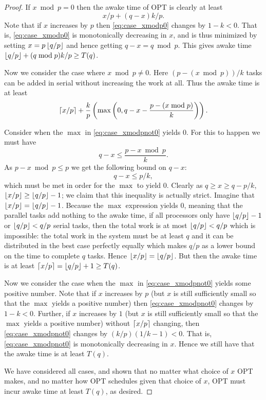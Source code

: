 \begin{proof}
  If $x\bmod p = 0$ then the awake time of OPT is clearly at
  least 
  \begin{equation} \label{eq:case_xmodp0}
    x/p + (q-x)k/p.
  \end{equation}
  Note that if $x$ increases by $p$ then \eqref{eq:case_xmodp0}
  changes by $1-k < 0$. That is, \eqref{eq:case_xmodp0} is
  monotonically decreasing in $x$, and is thus minimized by
  setting $x = p\left\lfloor q/p \right\rfloor$ and hence getting $q-x = q\bmod p$.
  This gives awake time $\left\lfloor q/p \right\rfloor + (q\bmod p)k/p \ge T(q)$.

  Now we consider the case where $x\bmod p \neq 0$. Here $(p -
  (x\bmod p))/k$ tasks can be added in serial without
  increasing the work at all. Thus the awake time is at least
  \begin{equation} \label{eq:case_xmodpnot0}
    \left\lceil x/p \right\rceil + \frac{k}{p}\left( \max\left( 0, q-x - \frac{p-(x\bmod p)}{k} \right) \right).
  \end{equation}

  Consider when the $\max$ in \eqref{eq:case_xmodpnot0} yields $0$. 
  For this to happen we must have
  $$q-x \le \frac{p-x\bmod p}{k}.$$
  As $p-x\bmod p \le p$ we get the following bound on $q-x$:
  $$q-x \le p/k,$$
  which must be met in order for the $\max$ to yield $0$.
  Clearly as $q \ge x \ge q-p/k$, $\left\lfloor x/p \right\rfloor \ge \left\lfloor q/p \right\rfloor-1$; we
  claim that this inequality is actually strict. Imagine that
  $\left\lfloor x/p \right\rfloor = \left\lfloor q/p \right\rfloor-1$. Because the $\max$ expression
  yields $0$, meaning that the parallel tasks add nothing to the
  awake time, if all processors only have $\left\lfloor q/p \right\rfloor-1$ or
  $\left\lfloor q/p \right\rfloor < q/p$ serial tasks, then the total work is at
  most $\left\lfloor q/p \right\rfloor < q/p$ which is impossible: the total work in
  the system must be at least $q$ and it can be distributed in
  the best case perfectly equally which makes $q/p$ as a lower
  bound on the time to complete $q$ tasks. Hence $\left\lfloor x/p \right\rfloor = \left\lfloor q/p \right\rfloor$. 
  But then the awake time is at least $\left\lceil x/p \right\rceil = \left\lfloor q/p \right\rfloor + 1 \ge T(q)$.

  Now we consider the case when the $\max$ in
  \eqref{eq:case_xmodpnot0} yields some positive number.
  Note that if $x$ increases by $p$ (but $x$ is still
  sufficiently small so that the $\max$ yields a positive number)
  then \eqref{eq:case_xmodpnot0} changes by $1-k < 0$.
  Further, if $x$ increases by $1$ (but $x$ is still
  sufficiently small so that the $\max$ yields a positive number) without $\left\lceil x/p \right\rceil$
  changing, then \eqref{eq:case_xmodpnot0} changes by $(k/p)(1/k
  -1) < 0$. That is, \eqref{eq:case_xmodpnot0} is monotonically
  decreasing in $x$. Hence we still have that the awake time is at least $T(q).$

  We have considered all cases, and shown that no matter what
  choice of $x$ OPT makes, and no matter how OPT schedules given
  that choice of $x$, OPT must incur awake time at least $T(q)$,
  as desired.
\end{proof}


